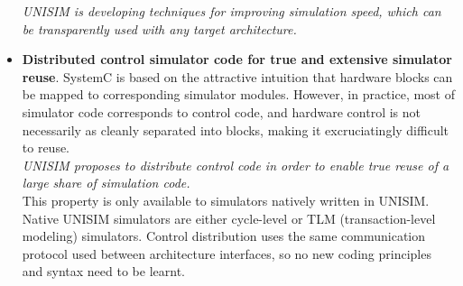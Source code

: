 \begin{itemize}
\emph{UNISIM is developing techniques for improving simulation speed, which can be transparently used with any target architecture.}
\item \textbf{Distributed control simulator code for true and extensive simulator reuse}. SystemC is based on the attractive intuition that hardware blocks can be mapped to corresponding simulator modules. However, in practice, most of simulator code corresponds to control code, and hardware control is not necessarily as cleanly separated into blocks, making it excruciatingly difficult to reuse.\\
\emph{UNISIM proposes to distribute control code in order to enable true reuse of a large share of simulation code.}\\
This property is only available to simulators natively written in UNISIM. Native UNISIM simulators are either cycle-level or TLM (transaction-level modeling) simulators. Control distribution uses the same communication protocol used between architecture interfaces, so no new coding principles and syntax need to be learnt.
\end{itemize}
